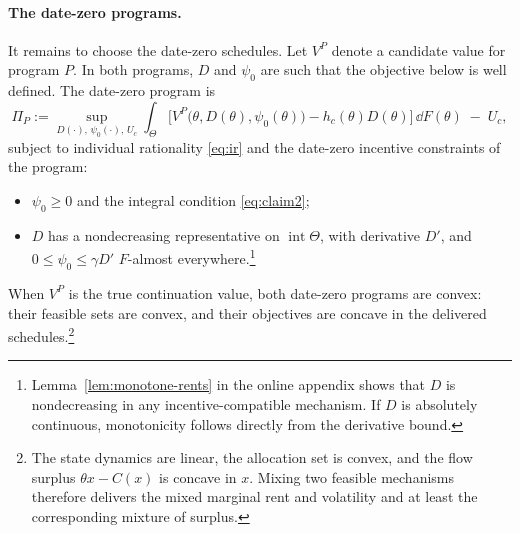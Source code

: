 \documentclass[12pt]{article}
\begin{document}
\paragraph{The date-zero programs.}
It remains to choose the date-zero schedules. Let \(V^P\) denote a
candidate value for program \(P\). In both programs, \(D\) and \(\psi_0\) are such that the
objective below is well defined. The date-zero program
is
\begin{equation}\label{eq:program}
  \Pi_P
  :=
  \sup_{D(\cdot),\,\psi_0(\cdot),\,U_c}
  \int_\Theta
  \bigl[V^{P}\bigl(\theta,D(\theta),\psi_0(\theta)\bigr)
  -h_c(\theta)D(\theta)\bigr]\,\dd F(\theta)
  \;-\;U_c,
\end{equation}
subject to individual rationality \eqref{eq:ir} and the date-zero
incentive constraints of the program:
\begin{itemize}
  \item[\(\mathrm{FV}\):] \(\psi_0\geq0\) and the integral condition
  \eqref{eq:claim2};
  \item[\(\mathrm{loc}\):] \(D\) has a nondecreasing representative on
  \(\operatorname{int}\Theta\), with derivative \(D'\), and
  \(0\leq\psi_0\leq\gamma D'\) \(F\)-almost everywhere.\footnote{Lemma~\ref{lem:monotone-rents} in the online appendix
shows that \(D\) is nondecreasing in any incentive-compatible
mechanism. If \(D\) is absolutely continuous, monotonicity
follows directly from the derivative bound.}
\end{itemize}
When \(V^P\) is the true continuation value, both date-zero programs are convex:
their feasible sets are convex, and their objectives are concave in the
delivered schedules.\footnote{The state dynamics
are linear, the allocation set is convex, and the flow surplus
\(\theta x-C(x)\) is concave in \(x\). Mixing two feasible mechanisms
therefore delivers the mixed marginal rent and volatility and at least
the corresponding mixture of surplus.}
\end{document}

